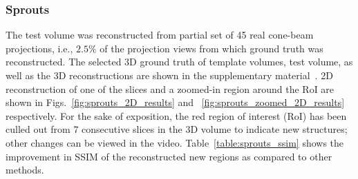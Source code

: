 \documentclass[journal]{IEEEtran}
\begin{document}
\subsubsection{\textbf{Sprouts}}
\label{Sec:sprouts_spatially_varying}

The test volume was reconstructed from partial set of 45 real
cone-beam projections, i.e., $2.5\%$ of the projection views from
which ground truth was reconstructed. The selected 3D ground truth of
template volumes, test volume, as well as the 3D reconstructions are
shown in the supplementary material~\cite{supp_paper}.  2D
reconstruction of one of the slices and a zoomed-in region around the
RoI are shown in Figs.~\ref{fig:sprouts_2D_results} and
~\ref{fig:sprouts_zoomed_2D_results} respectively. For the sake of
exposition, the red region of interest (RoI) has been culled out from
7 consecutive slices in the 3D volume to indicate new structures;
other changes can be viewed in the
video. Table~\ref{table:sprouts_ssim} shows the improvement in SSIM of
the reconstructed new regions as compared to other methods.
\end{document}
